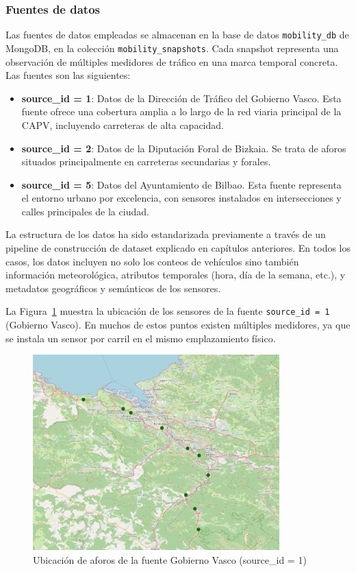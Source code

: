 \subsubsection{Fuentes de datos}
Las fuentes de datos empleadas se almacenan en la base de datos \texttt{mobility\_db} de MongoDB, en la colección \texttt{mobility\_snapshots}. Cada snapshot representa una observación de múltiples medidores de tráfico en una marca temporal concreta. Las fuentes son las siguientes:

\begin{itemize}
	\item \textbf{source\_id = 1}: Datos de la Dirección de Tráfico del Gobierno Vasco. Esta fuente ofrece una cobertura amplia a lo largo de la red viaria principal de la CAPV, incluyendo carreteras de alta capacidad.
	\item \textbf{source\_id = 2}: Datos de la Diputación Foral de Bizkaia. Se trata de aforos situados principalmente en carreteras secundarias y forales.
	\item \textbf{source\_id = 5}: Datos del Ayuntamiento de Bilbao. Esta fuente representa el entorno urbano por excelencia, con sensores instalados en intersecciones y calles principales de la ciudad.
\end{itemize}

La estructura de los datos ha sido estandarizada previamente a través de un pipeline de construcción de dataset explicado en capítulos anteriores. En todos los casos, los datos incluyen no solo los conteos de vehículos sino también información meteorológica, atributos temporales (hora, día de la semana, etc.), y metadatos geográficos y semánticos de los sensores.

La Figura~\ref{fig:sourceid1_map} muestra la ubicación de los sensores de la fuente \texttt{source\_id = 1} (Gobierno Vasco). En muchos de estos puntos existen múltiples medidores, ya que se instala un sensor por carril en el mismo emplazamiento físico.

\begin{figure}[H]
	\centering
	\includegraphics[width=0.85\textwidth]{includes/cap5/source_id_1_meters.png}
	\caption{Ubicación de aforos de la fuente Gobierno Vasco (source\_id = 1)}
	\label{fig:sourceid1_map}
\end{figure}

